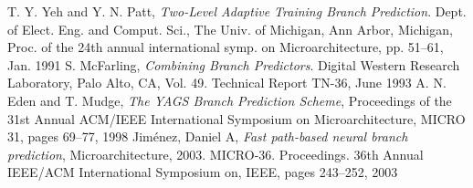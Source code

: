 \documentclass[conference]{IEEEtran}
\begin{document}













\begin{thebibliography}{5}

T. Y. Yeh and Y. N. Patt, \emph{Two-Level Adaptive Training Branch Prediction}. Dept. of Elect. Eng. and Comput. Sci., The Univ. of Michigan, Ann Arbor, Michigan, Proc. of the 24th annual international symp. on Microarchitecture, pp. 51–61, Jan. 1991
S. McFarling, \emph{Combining Branch Predictors}. Digital Western Research Laboratory, Palo Alto, CA, Vol. 49. Technical Report TN-36, June 1993 
A. N. Eden and T. Mudge, \emph{The YAGS Branch Prediction Scheme}, Proceedings of the 31st Annual ACM/IEEE International Symposium on Microarchitecture, MICRO 31, pages 69--77, 1998
Jim{\'e}nez, Daniel A, \emph{Fast path-based neural branch prediction}, Microarchitecture, 2003. MICRO-36. Proceedings. 36th Annual IEEE/ACM International Symposium on, IEEE, pages 243--252, 2003 


\end{thebibliography}
\end{document}
